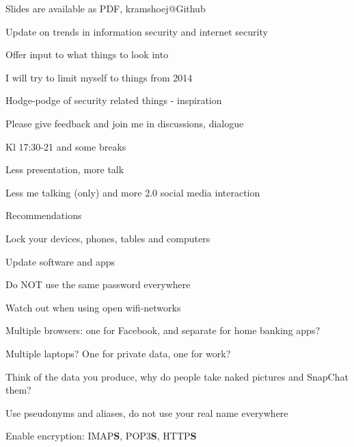 \documentclass[20pt,landscape,a4paper,footrule]{foils}
\begin{document}


\vskip 2cm
\centerline{\footnotesize Slides are available as PDF, kramshoej@Github}


\begin{list1}
\item Update on trends in information security and internet security
\item Offer input to what things to look into
\vskip 2cm
\item I will try to limit myself to things from 2014
\item Hodge-podge of security related things - inspiration 
\item Please give feedback and join me in discussions, dialogue \smiley
\end{list1}



\begin{list1}
\item Kl 17:30-21 and some breaks
\item Less presentation, more talk 
\item Less me talking (only) and more 2.0 social media interaction
\end{list1}


Recommendations 
\begin{list2}
\item Lock your devices, phones, tables and computers
\item Update software and apps
\item Do NOT use the same password everywhere
\item Watch out when using open wifi-networks
\item Multiple browsers: one for Facebook, and separate for home banking apps?
\item Multiple laptops? One for private data, one for work?
\item Think of the data you produce, why do people take naked pictures and SnapChat them?
\item Use pseudonyms and aliases, do not use your real name everywhere
\item Enable encryption: IMAP{\bf S}, POP3{\bf S},
  HTTP{\bf S} \\
\end{list2}
\end{document}
